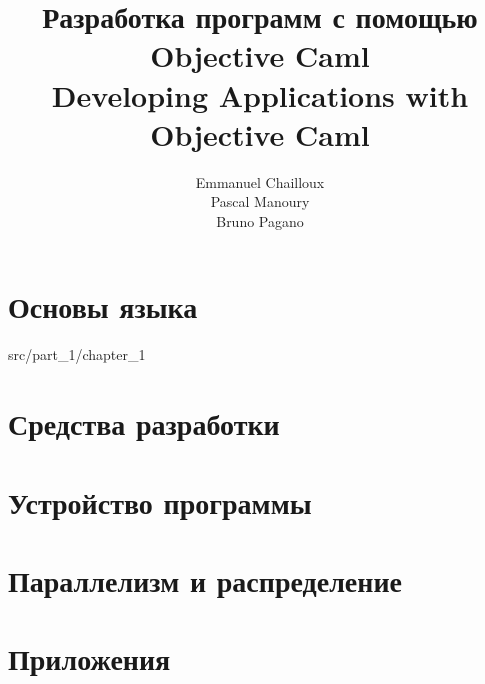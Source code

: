 \documentclass[12pt,a4paper]{book}
\begin{document}
\title{Разработка программ с помощью Objective Caml\\
Developing Applications with Objective Caml}
\author{Emmanuel Chailloux\\ Pascal Manoury\\ Bruno Pagano}

\maketitle

\tableofcontents

\part{Основы языка}
 {src/part_1/chapter_1}

\part{Средства разработки}

\part{Устройство программы}

\part{Параллелизм и распределение}

\part{Приложения}
\end{document}

